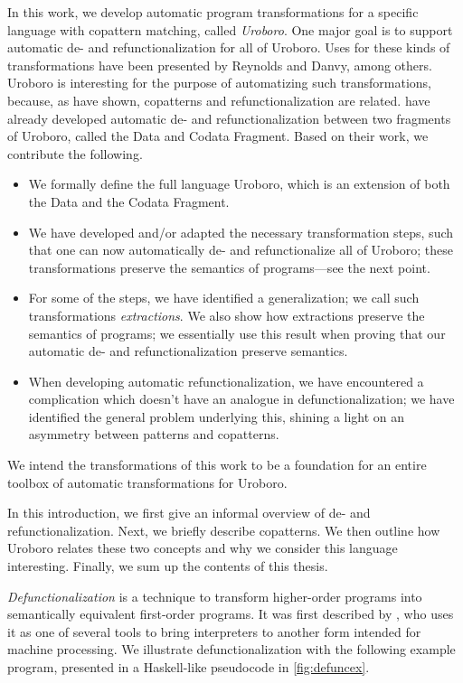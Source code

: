 In this work, we develop automatic program transformations for a specific language with copattern matching, called \textit{Uroboro}. One major goal is to support automatic de- and refunctionalization for all of Uroboro. Uses for these kinds of transformations have been presented by Reynolds and Danvy, among others. Uroboro is interesting for the purpose of automatizing such transformations, because, as \citet{rendel15automatic} have shown, copatterns and refunctionalization are related. \citeauthor{rendel15automatic} have already developed automatic de- and refunctionalization between two fragments of Uroboro, called the Data and Codata Fragment. Based on their work, we contribute the following.
\begin{itemize}
\item We formally define the full language Uroboro, which is an extension of both the Data and the Codata Fragment.

\item We have developed and/or adapted the necessary transformation steps, such that one can now automatically de- and refunctionalize all of Uroboro; these transformations preserve the semantics of programs---see the next point.

\item For some of the steps, we have identified a generalization; we call such transformations \textit{extractions}. We also show how extractions preserve the semantics of programs; we essentially use this result when proving that our automatic de- and refunctionalization preserve semantics.

\item When developing automatic refunctionalization, we have encountered a complication which doesn't have an analogue in defunctionalization; we have identified the general problem underlying this, shining a light on an asymmetry between patterns and copatterns.
\end{itemize}
We intend the transformations of this work to be a foundation for an entire toolbox of automatic transformations for Uroboro.

In this introduction, we first give an informal overview of de- and refunctionalization. Next, we briefly describe copatterns. We then outline how Uroboro relates these two concepts and why we consider this language interesting. Finally, we sum up the contents of this thesis.

\textit{Defunctionalization} is a technique to transform higher-order programs into semantically equivalent first-order programs. It was first described by \citet{reynolds72definitional}, who uses it as one of several tools to bring interpreters to another form intended for machine processing. We illustrate defunctionalization with the following example program, presented in a Haskell-like pseudocode in \autoref{fig:defuncex}.

